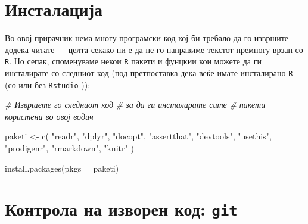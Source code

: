 \documentclass[
]{book}
\newenvironment{Shaded}{\begin{snugshade}}{\end{snugshade}}
\newcommand{\AttributeTok}[1]{\textcolor[rgb]{0.77,0.63,0.00}{#1}}
\newcommand{\CommentTok}[1]{\textcolor[rgb]{0.56,0.35,0.01}{\textit{#1}}}
\newcommand{\FunctionTok}[1]{\textcolor[rgb]{0.00,0.00,0.00}{#1}}
\newcommand{\NormalTok}[1]{#1}
\newcommand{\OtherTok}[1]{\textcolor[rgb]{0.56,0.35,0.01}{#1}}
\newcommand{\StringTok}[1]{\textcolor[rgb]{0.31,0.60,0.02}{#1}}
\begin{document}
\hypertarget{ux438ux43dux441ux442ux430ux43bux430ux446ux438ux458ux430}{%
\section{Инсталација}\label{ux438ux43dux441ux442ux430ux43bux430ux446ux438ux458ux430}}

Во овој прирачник нема многу програмски код кој би требало да го извршите додека читате --- целта секако ни е да не го направиме текстот премногу врзан со \texttt{R}. Но сепак, споменуваме некои \texttt{R} пакети и фунцкии кои можете да ги инсталирате со следниот код (под претпоставка дека веќе имате инсталирано \href{https://cloud.r-project.org/}{\texttt{R}} (со или без \href{https://rstudio.com/products/rstudio/download/}{\texttt{Rstudio}} )):

\begin{Shaded}
\begin{Highlighting}[]
\CommentTok{\# Извршете го следниот код}
\CommentTok{\# за да ги инсталирате сите }
\CommentTok{\# пакети користени во овој водич}

\NormalTok{paketi }\OtherTok{\textless{}{-}} \FunctionTok{c}\NormalTok{(}
  \StringTok{"readr"}\NormalTok{,}
  \StringTok{"dplyr"}\NormalTok{,}
  \StringTok{"docopt"}\NormalTok{,}
  \StringTok{"assertthat"}\NormalTok{,}
  \StringTok{"devtools"}\NormalTok{,}
  \StringTok{"usethis"}\NormalTok{,}
  \StringTok{"prodigenr"}\NormalTok{,}
  \StringTok{"rmarkdown"}\NormalTok{,}
  \StringTok{"knitr"}
\NormalTok{)}

\FunctionTok{install.packages}\NormalTok{(}\AttributeTok{pkgs =}\NormalTok{ paketi)}
\end{Highlighting}
\end{Shaded}

\hypertarget{ux43aux43eux43dux442ux440ux43eux43bux430-ux43dux430-ux438ux437ux432ux43eux440ux435ux43d-ux43aux43eux434-git}{%
\section{\texorpdfstring{Контрола на изворен код: \texttt{git}}{Контрола на изворен код: git}}\label{ux43aux43eux43dux442ux440ux43eux43bux430-ux43dux430-ux438ux437ux432ux43eux440ux435ux43d-ux43aux43eux434-git}}
\end{document}

